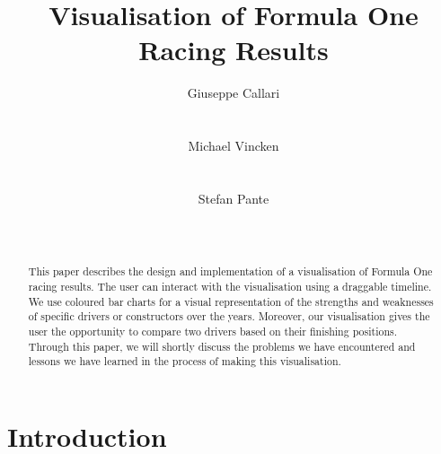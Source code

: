 \documentclass{sigchi}
\begin{document}
\title{Visualisation of Formula One Racing Results}

\author{
  \alignauthor Giuseppe Callari\\
    \\
    \\
  \alignauthor Michael Vincken\\
    \\
    \\
  \alignauthor Stefan Pante\\
    \\
    \\
}

\maketitle

\begin{abstract}
This paper describes the design and implementation of a visualisation of Formula One racing results. The user can interact with the visualisation using a draggable timeline. We use coloured bar charts for a visual representation of the strengths and weaknesses of specific drivers or constructors over the years. Moreover, our visualisation gives the user the opportunity to compare two drivers based on their finishing positions. Through this paper, we will shortly discuss the problems we have encountered and lessons we have learned in the process of making this visualisation.

\end{abstract}




\section{Introduction}
\end{document}
